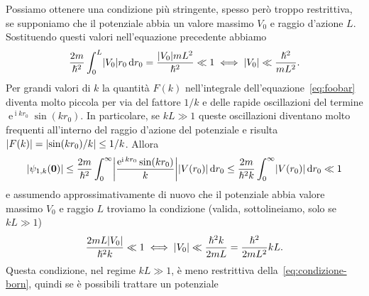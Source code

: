 \documentclass[a4paper,fleqn,twoside,12pt]{article}
\newcommand*{\dd}{\mathop{}\!\mathrm{d}} %
\DeclareMathOperator{\e}{\mathrm{e}} %
\DeclareMathOperator{\uimm}{\mathrm{i}} %
\DeclarePairedDelimiter{\abs}{\lvert}{\rvert}
\begin{document}
Possiamo ottenere una condizione più stringente, spesso però troppo restrittiva,
se supponiamo che il potenziale abbia un valore massimo $V_{0}$ e raggio
d'azione $L$.  Sostituendo questi valori nell'equazione precedente abbiamo
\begin{equation}
  \label{eq:condizione-born}
  \frac{2m}{\hslash^{2}}\int_{0}^{L}\abs{V_{0}}r_{0}\dd r_{0} =
  \frac{\abs{V_{0}}mL^{2}}{\hslash^{2}} \ll 1 \iff \abs{V_{0}} \ll
  \frac{\hslash^{2}}{mL^{2}}.
\end{equation}
Per grandi valori di $k$ la quantità $F(k)$ nell'integrale
dell'equazione~\eqref{eq:foobar} diventa molto piccola per via del fattore $1/k$
e delle rapide oscillazioni del termine $\e^{\uimm kr_{0}}\sin(kr_{0})$.  In
particolare, se $kL \gg 1$ queste oscillazioni diventano molto frequenti
all'interno del raggio d'azione del potenziale e risulta
$\abs{F(k)} = \abs{\sin(kr_{0})/k} \leq 1/k$.  Allora
\begin{equation}
  \abs{\psi_{1,k}(\bm{0})} \leq \frac{2m}{\hslash^{2}} \int_{0}^{\infty}
  \abs*{\frac{\e^{\uimm kr_{0}}\sin(kr_{0})}{k}} \abs{V(r_{0})} \dd r_{0} \leq
  \frac{2m}{\hslash^{2}k} \int_{0}^{\infty} \abs{V(r_{0})} \dd r_{0} \ll 1
\end{equation}
e assumendo approssimativamente di nuovo che il potenziale abbia valore massimo
$V_{0}$ e raggio $L$ troviamo la condizione (valida, sottolineiamo, solo se
$kL \gg 1$)
\begin{equation}
  \frac{2mL\abs{V_{0}}}{\hslash^{2}k} \ll 1 \iff \abs{V_{0}} \ll
  \frac{\hslash^{2}k}{2mL} = \frac{\hslash^{2}}{2mL^{2}} kL. %
\end{equation}
Questa condizione, nel regime $kL \gg 1$, è meno restrittiva
della~\eqref{eq:condizione-born}, quindi se è possibili trattare un potenziale
\end{document}
